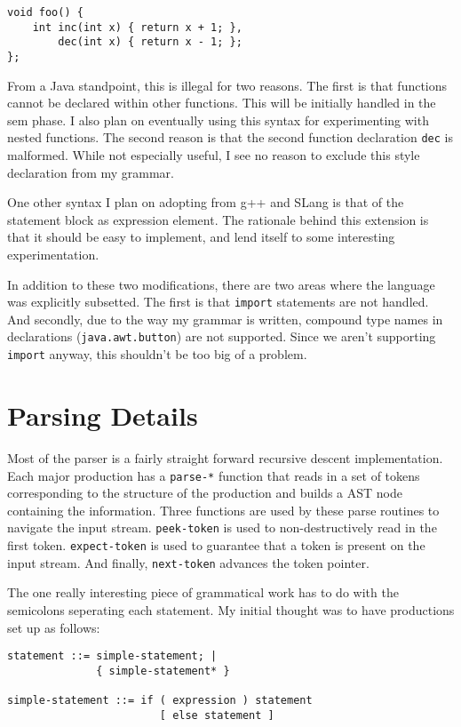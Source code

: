 \documentclass{article}[1994/05/24]
\begin{document}
\begin{verbatim}
void foo() {
    int inc(int x) { return x + 1; },
        dec(int x) { return x - 1; };
};
\end{verbatim}

	From a Java standpoint, this is illegal for two reasons.
The first is that functions cannot be declared within other functions.
This will be initially handled in the sem phase. I also plan on
eventually using this syntax for experimenting with nested functions.
The second reason is that the second function declaration \verb|dec|
is malformed.  While not especially useful, I see no reason to 
exclude this style declaration from my grammar.

	One other syntax I plan on adopting from g++ and SLang
is that of the statement block as expression element. The rationale
behind this extension is that it should be easy to implement, and
lend itself to some interesting experimentation.

	In addition to these two modifications, there are two areas
where the language was explicitly subsetted.  The first is that
\verb|import| statements are not handled.   And secondly, due to 
the way my grammar is written, compound type names in declarations
(\verb|java.awt.button|) are not supported. Since we aren't supporting 
\verb|import| anyway, this shouldn't be too big of a problem.

\section{Parsing Details}

	Most of the parser is a fairly straight forward recursive
descent implementation.  Each major production has a \verb|parse-*|
function that reads in a set of tokens corresponding to the structure
of the production and builds a AST node containing the information.
Three functions are used by these parse routines to navigate the
input stream.  \verb|peek-token| is used to non-destructively read in
the first token.  \verb|expect-token| is used to guarantee that a token
is present on the input stream. And finally, \verb|next-token| advances the
token pointer.


	The one really interesting piece of grammatical work
has to do with the semicolons seperating each statement.  
My initial thought was to have productions set up as follows:

\begin{verbatim}
statement ::= simple-statement; | 
              { simple-statement* }

simple-statement ::= if ( expression ) statement 
                        [ else statement ]
\end{verbatim}
\end{document}
